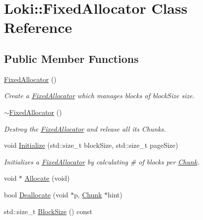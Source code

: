 \hypertarget{classLoki_1_1FixedAllocator}{}\section{Loki\+:\+:Fixed\+Allocator Class Reference}
\label{classLoki_1_1FixedAllocator}
\subsection*{Public Member Functions}
\begin{DoxyCompactItemize}
\item 
\hypertarget{classLoki_1_1FixedAllocator_ace7ad725a2f44c427641f4ce629a3aac}{}\hyperlink{classLoki_1_1FixedAllocator_ace7ad725a2f44c427641f4ce629a3aac}{Fixed\+Allocator} ()\label{classLoki_1_1FixedAllocator_ace7ad725a2f44c427641f4ce629a3aac}

\begin{DoxyCompactList}\small\item\em Create a \hyperlink{classLoki_1_1FixedAllocator}{Fixed\+Allocator} which manages blocks of \textquotesingle{}block\+Size\textquotesingle{} size. \end{DoxyCompactList}\item 
\hypertarget{classLoki_1_1FixedAllocator_a080589e92d310aeb4e432d195bcd7ba5}{}\hyperlink{classLoki_1_1FixedAllocator_a080589e92d310aeb4e432d195bcd7ba5}{$\sim$\+Fixed\+Allocator} ()\label{classLoki_1_1FixedAllocator_a080589e92d310aeb4e432d195bcd7ba5}

\begin{DoxyCompactList}\small\item\em Destroy the \hyperlink{classLoki_1_1FixedAllocator}{Fixed\+Allocator} and release all its Chunks. \end{DoxyCompactList}\item 
\hypertarget{classLoki_1_1FixedAllocator_a5fb8edbf26f6ab26a0c332391909fa0c}{}void \hyperlink{classLoki_1_1FixedAllocator_a5fb8edbf26f6ab26a0c332391909fa0c}{Initialize} (std\+::size\+\_\+t block\+Size, std\+::size\+\_\+t page\+Size)\label{classLoki_1_1FixedAllocator_a5fb8edbf26f6ab26a0c332391909fa0c}

\begin{DoxyCompactList}\small\item\em Initializes a \hyperlink{classLoki_1_1FixedAllocator}{Fixed\+Allocator} by calculating \# of blocks per \hyperlink{classLoki_1_1Chunk}{Chunk}. \end{DoxyCompactList}\item 
void $\ast$ \hyperlink{classLoki_1_1FixedAllocator_ac29973a11534fb1006fd28db97a17bed}{Allocate} (void)
\item 
bool \hyperlink{classLoki_1_1FixedAllocator_a49ab7ca3364fe05f2d7d91248ee5d0e3}{Deallocate} (void $\ast$p, \hyperlink{classLoki_1_1Chunk}{Chunk} $\ast$hint)
\item 
\hypertarget{classLoki_1_1FixedAllocator_a37df732230913b2dd9126a6b311586f0}{}std\+::size\+\_\+t \hyperlink{classLoki_1_1FixedAllocator_a37df732230913b2dd9126a6b311586f0}{Block\+Size} () const \label{classLoki_1_1FixedAllocator_a37df732230913b2dd9126a6b311586f0}


\end{DoxyCompactItemize}

